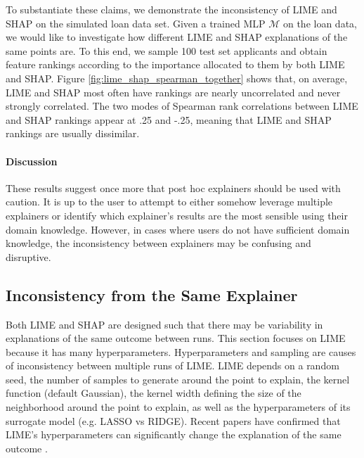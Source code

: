 \documentclass[11pt]{article}    %
\begin{document}
            To substantiate these claims, we demonstrate the inconsistency of LIME and SHAP on the simulated loan data set. Given a trained MLP $\mathcal{M}$ on the loan data, we would like to investigate how different LIME and SHAP explanations of the same points are. To this end, we sample 100 test set applicants and obtain feature rankings according to the importance allocated to them by both LIME and SHAP. Figure \ref{fig:lime_shap_spearman_together} shows that, on average, LIME and SHAP most often have rankings are nearly uncorrelated and never strongly correlated. The two modes of Spearman rank correlations between LIME and SHAP rankings appear at .25 and -.25, meaning that LIME and SHAP rankings are usually dissimilar. 
            
            \paragraph{Discussion}
            These results suggest once more that post hoc explainers should be used with caution. It is up to the user to attempt to either somehow leverage multiple explainers or identify which explainer's results are the most sensible using their domain knowledge. However, in cases where users do not have sufficient domain knowledge, the inconsistency between explainers may be confusing and disruptive.%

        



    \subsection{Inconsistency from the Same Explainer}
            \label{sec:conflict_within}
             Both LIME and SHAP are designed such that there may be variability in explanations of the same outcome between runs. This section focuses on LIME because it has many hyperparameters. 
             Hyperparameters and sampling are causes of inconsistency between multiple runs of LIME. LIME depends on a random seed, the number of samples to generate around the point to explain, the kernel function (default Gaussian), the kernel width defining the size of the neighborhood around the point to explain, as well as  the hyperparameters of its surrogate model (e.g. LASSO vs RIDGE). Recent papers have confirmed that LIME's hyperparameters can significantly change the explanation of the same outcome \citep{rahnama19shift,visani21stability}.
\end{document}
